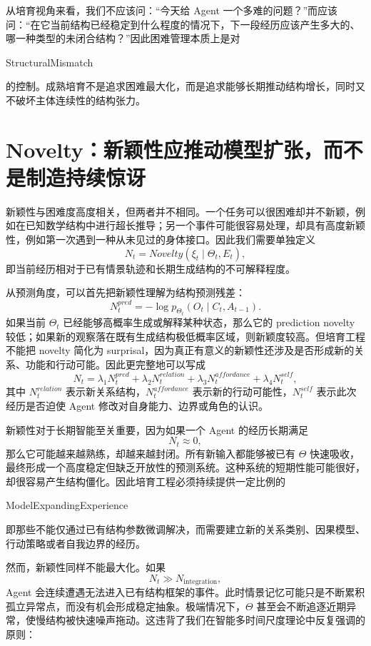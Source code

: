 从培育视角来看，我们不应该问：“今天给 Agent 一个多难的问题？”而应该问：“在它当前结构已经稳定到什么程度的情况下，下一段经历应该产生多大的、哪一种类型的未闭合结构？”因此困难管理本质上是对
\begin{statementbox}
StructuralMismatch
\end{statementbox}
的控制。成熟培育不是追求困难最大化，而是追求能够长期推动结构增长，同时又不破坏主体连续性的结构张力。

\section{Novelty：新颖性应推动模型扩张，而不是制造持续惊讶}

新颖性与困难度高度相关，但两者并不相同。一个任务可以很困难却并不新颖，例如在已知数学结构中进行超长推导；另一个事件可能很容易处理，却具有高度新颖性，例如第一次遇到一种从未见过的身体接口。因此我们需要单独定义
\[
N_t
=
Novelty(\xi_t\mid\Theta_t,E_t),
\]
即当前经历相对于已有情景轨迹和长期生成结构的不可解释程度。

从预测角度，可以首先把新颖性理解为结构预测残差：
\[
N_t^{pred}
=
-\log
p_{\Theta_t}
\left(
O_t
\mid
C_t,A_{t-1}
\right).
\]
如果当前 $\Theta_t$ 已经能够高概率生成或解释某种状态，那么它的 prediction novelty 较低；如果新的观察落在既有生成结构极低概率区域，则新颖度较高。但培育工程不能把 novelty 简化为 surprisal，因为真正有意义的新颖性还涉及是否形成新的关系、功能和行动可能。因此更完整地可以写成
\[
N_t
=
\lambda_1 N_t^{pred}
+
\lambda_2 N_t^{relation}
+
\lambda_3 N_t^{affordance}
+
\lambda_4 N_t^{self},
\]
其中 $N_t^{relation}$ 表示新关系结构，$N_t^{affordance}$ 表示新的行动可能性，$N_t^{self}$ 表示此次经历是否迫使 Agent 修改对自身能力、边界或角色的认识。

新颖性对于长期智能至关重要，因为如果一个 Agent 的经历长期满足
\[
N_t\approx 0,
\]
那么它可能越来越熟练，却越来越封闭。所有新输入都能够被已有 $\Theta$ 快速吸收，最终形成一个高度稳定但缺乏开放性的预测系统。这种系统的短期性能可能很好，却很容易产生结构僵化。因此培育工程必须持续提供一定比例的
\begin{statementbox}
ModelExpandingExperience
\end{statementbox}
即那些不能仅通过已有结构参数微调解决，而需要建立新的关系类别、因果模型、行动策略或者自我边界的经历。

然而，新颖性同样不能最大化。如果
\[
N_t
\gg
N_{\mathrm{integration}},
\]
Agent 会连续遭遇无法进入已有结构框架的事件。此时情景记忆可能只是不断累积孤立异常点，而没有机会形成稳定抽象。极端情况下，$\Theta$ 甚至会不断追逐近期异常，使慢结构被快速噪声拖动。这违背了我们在智能多时间尺度理论中反复强调的原则：
\begin{statementbox}
\centering
{}
\end{statementbox}

